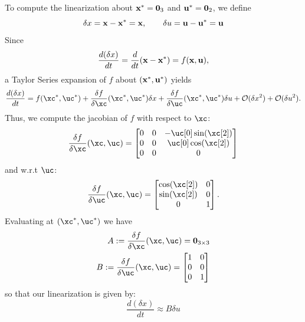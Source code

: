 \documentclass{homework}
\begin{document}
\begin{letterenum}
    \item To compute the linearization about ${\bf x}^* = {\bf 0}_3$ and
    ${\bf u}^* = {\bf 0}_2$, we define
    \begin{equation}
        \delta x = {\bf x} - {\bf x}^* = {\bf x}, \qquad
        \delta u = {\bf u} - {\bf u}^* = {\bf u}
    \end{equation}
    Since
    \begin{equation}
        \frac{d (\delta x)}{dt} = \frac{d}{dt} ({\bf x} - {\bf x}^*)
        = f({\bf x}, {\bf u}),
    \end{equation}
    a Taylor Series expansion of $f$ about $({\bf x}^*, {\bf u}^*)$ yields
    \begin{equation}
        \frac{d (\delta x)}{dt} = f(\xc^*, \uc^*)
            + \frac{\delta f}{\delta \xc}(\xc^*, \uc^*) \delta x
            + \frac{\delta f}{\delta \uc}(\xc^*, \uc^*) \delta u
            + \mathcal{O}(\delta x^2) + \mathcal{O}(\delta u^2).
    \end{equation}
    Thus, we compute the jacobian of $f$ with respect to $\xc$:
    \begin{equation}
        \frac{\delta f}{\delta \xc}(\xc, \uc) = \begin{bmatrix}
            0 & 0 & - \uc[0] \sin ( \xc[2]) \\
            0 & 0 & \uc[0] \cos ( \xc[2]) \\
            0 & 0 & 0
        \end{bmatrix}
        \label{eq:jacobian-x}
    \end{equation}
    and w.r.t $\uc$:
    \begin{equation}
        \frac{\delta f}{\delta \uc}(\xc, \uc) = \begin{bmatrix}
            \cos ( \xc[2]) & 0 \\
            \sin ( \xc[2]) & 0 \\
            0 & 1
        \end{bmatrix}.
        \label{eq:jacobian-u}
    \end{equation}
    Evaluating at $(\xc^*, \uc^*)$ we have
    \begin{align}
        A := \frac{\delta f}{\delta \xc}(\xc, \uc) = {\bf 0}_{3 \times 3} \\
        B := \frac{\delta f}{\delta \uc}(\xc, \uc) = \begin{bmatrix}
            1 & 0 \\
            0 & 0 \\
            0 & 1
        \end{bmatrix}
    \end{align}
    so that our linearization is given by:
    \begin{equation}
        \boxed{\frac{d (\delta x)}{dt} \approx B \delta u}
    \end{equation}


\end{letterenum}
\end{document}

